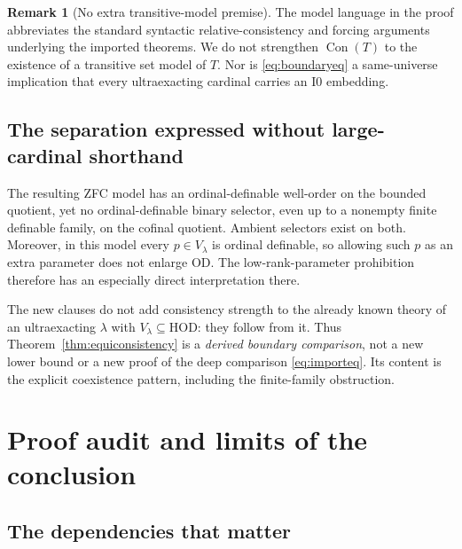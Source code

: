 \documentclass[11pt,letterpaper]{article}
\theoremstyle{definition}
\newcommand{\HOD}{\mathrm{HOD}}
\newcommand{\Con}{\operatorname{Con}}
\newcommand{\Izero}{\mathrm{I0}}
\newtheorem{remark}[definition]{Remark}
\begin{document}
\begin{remark}[No extra transitive-model premise]
The model language in the proof abbreviates the standard syntactic relative-consistency and forcing arguments underlying the imported theorems. We do not strengthen $\Con(T)$ to the existence of a transitive set model of $T$. Nor is \eqref{eq:boundaryeq} a same-universe implication that every ultraexacting cardinal carries an $\Izero$ embedding.
\end{remark}

\subsection{The separation expressed without large-cardinal shorthand}

The resulting ZFC model has an ordinal-definable well-order on the bounded quotient, yet no ordinal-definable binary selector, even up to a nonempty finite definable family, on the cofinal quotient. Ambient selectors exist on both. Moreover, in this model every $p\in V_\lambda$ is ordinal definable, so allowing such $p$ as an extra parameter does not enlarge OD. The low-rank-parameter prohibition therefore has an especially direct interpretation there.

The new clauses do not add consistency strength to the already known theory of an ultraexacting $\lambda$ with $V_\lambda\subseteq\HOD$: they follow from it. Thus Theorem~\ref{thm:equiconsistency} is a \emph{derived boundary comparison}, not a new lower bound or a new proof of the deep comparison \eqref{eq:importeq}. Its content is the explicit coexistence pattern, including the finite-family obstruction.

\section{Proof audit and limits of the conclusion}\label{sec:audit}

\subsection{The dependencies that matter}
\end{document}
